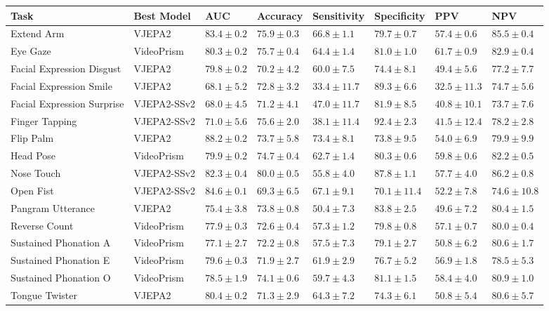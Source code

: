 \begin{table}
\label{tab:race_dist}
\begin{tabular}{llllllll}
\toprule
Task & Best Model & AUC & Accuracy & Sensitivity & Specificity & PPV & NPV \\
\midrule
Extend Arm & VJEPA2 & $83.4 \pm 0.2$ & $75.9 \pm 0.3$ & $66.8 \pm 1.1$ & $79.7 \pm 0.7$ & $57.4 \pm 0.6$ & $85.5 \pm 0.4$ \\
Eye Gaze & VideoPrism & $80.3 \pm 0.2$ & $75.7 \pm 0.4$ & $64.4 \pm 1.4$ & $81.0 \pm 1.0$ & $61.7 \pm 0.9$ & $82.9 \pm 0.4$ \\
Facial Expression Disgust & VJEPA2 & $79.8 \pm 0.2$ & $70.2 \pm 4.2$ & $60.0 \pm 7.5$ & $74.4 \pm 8.1$ & $49.4 \pm 5.6$ & $77.2 \pm 7.7$ \\
Facial Expression Smile & VJEPA2 & $68.1 \pm 5.2$ & $72.8 \pm 3.2$ & $33.4 \pm 11.7$ & $89.3 \pm 6.6$ & $32.5 \pm 11.3$ & $74.7 \pm 5.6$ \\
Facial Expression Surprise & VJEPA2-SSv2 & $68.0 \pm 4.5$ & $71.2 \pm 4.1$ & $47.0 \pm 11.7$ & $81.9 \pm 8.5$ & $40.8 \pm 10.1$ & $73.7 \pm 7.6$ \\
Finger Tapping & VJEPA2-SSv2 & $71.0 \pm 5.6$ & $75.6 \pm 2.0$ & $38.1 \pm 11.4$ & $92.4 \pm 2.3$ & $41.5 \pm 12.4$ & $78.2 \pm 2.8$ \\
Flip Palm & VJEPA2 & $88.2 \pm 0.2$ & $73.7 \pm 5.8$ & $73.4 \pm 8.1$ & $73.8 \pm 9.5$ & $54.0 \pm 6.9$ & $79.9 \pm 9.9$ \\
Head Pose & VideoPrism & $79.9 \pm 0.2$ & $74.7 \pm 0.4$ & $62.7 \pm 1.4$ & $80.3 \pm 0.6$ & $59.8 \pm 0.6$ & $82.2 \pm 0.5$ \\
Nose Touch & VJEPA2-SSv2 & $82.3 \pm 0.4$ & $80.0 \pm 0.5$ & $55.8 \pm 4.0$ & $87.8 \pm 1.1$ & $57.7 \pm 4.0$ & $86.2 \pm 0.8$ \\
Open Fist & VJEPA2-SSv2 & $84.6 \pm 0.1$ & $69.3 \pm 6.5$ & $67.1 \pm 9.1$ & $70.1 \pm 11.4$ & $52.2 \pm 7.8$ & $74.6 \pm 10.8$ \\
Pangram Utterance & VJEPA2 & $75.4 \pm 3.8$ & $73.8 \pm 0.8$ & $50.4 \pm 7.3$ & $83.8 \pm 2.5$ & $49.6 \pm 7.2$ & $80.4 \pm 1.5$ \\
Reverse Count & VideoPrism & $77.9 \pm 0.3$ & $72.6 \pm 0.4$ & $57.3 \pm 1.2$ & $79.8 \pm 0.8$ & $57.1 \pm 0.7$ & $80.0 \pm 0.4$ \\
Sustained Phonation A & VideoPrism & $77.1 \pm 2.7$ & $72.2 \pm 0.8$ & $57.5 \pm 7.3$ & $79.1 \pm 2.7$ & $50.8 \pm 6.2$ & $80.6 \pm 1.7$ \\
Sustained Phonation E & VideoPrism & $79.6 \pm 0.3$ & $71.9 \pm 2.7$ & $61.9 \pm 2.9$ & $76.7 \pm 5.2$ & $56.9 \pm 1.8$ & $78.5 \pm 5.3$ \\
Sustained Phonation O & VideoPrism & $78.5 \pm 1.9$ & $74.1 \pm 0.6$ & $59.7 \pm 4.3$ & $81.1 \pm 1.5$ & $58.4 \pm 4.0$ & $80.9 \pm 1.0$ \\
Tongue Twister & VJEPA2 & $80.4 \pm 0.2$ & $71.3 \pm 2.9$ & $64.3 \pm 7.2$ & $74.3 \pm 6.1$ & $50.8 \pm 5.4$ & $80.6 \pm 5.7$ \\
\bottomrule
\end{tabular}
\end{table}
